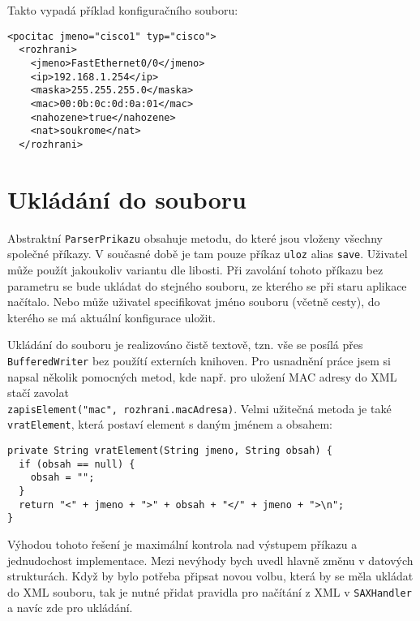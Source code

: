 Takto vypadá příklad konfiguračního souboru:
\begin{verbatim}
<pocitac jmeno="cisco1" typ="cisco">
  <rozhrani>
    <jmeno>FastEthernet0/0</jmeno>
    <ip>192.168.1.254</ip>
    <maska>255.255.255.0</maska>
    <mac>00:0b:0c:0d:0a:01</mac>
    <nahozene>true</nahozene>
    <nat>soukrome</nat>
  </rozhrani>
\end{verbatim} 


\section{Ukládání do souboru}
Abstraktní \verb|ParserPrikazu| obsahuje metodu, do které jsou vloženy všechny společné příkazy. V současné době je tam pouze příkaz \verb|uloz| alias \verb|save|. Uživatel může použít jakoukoliv variantu dle libosti. Při zavolání tohoto příkazu bez parametru se bude ukládat do stejného souboru, ze kterého se při staru aplikace načítalo. Nebo může uživatel specifikovat jméno souboru (včetně cesty), do kterého se má aktuální konfigurace uložit. 

Ukládání do souboru je realizováno čistě textově, tzn. vše se posílá přes \verb|BufferedWriter| bez použítí externích knihoven. Pro usnadnění práce jsem si napsal několik pomocných metod, kde např. pro uložení MAC adresy do XML stačí zavolat \\\verb|zapisElement("mac", rozhrani.macAdresa)|. Velmi užitečná metoda je také \verb|vratElement|, která postaví element s daným jménem a obsahem:
\begin{verbatim}
private String vratElement(String jmeno, String obsah) {
  if (obsah == null) {
    obsah = "";
  }
  return "<" + jmeno + ">" + obsah + "</" + jmeno + ">\n";
}
\end{verbatim} 


Výhodou tohoto řešení je maximální kontrola nad výstupem příkazu a jednudochost implementace. Mezi nevýhody bych uvedl hlavně změnu v datových strukturách. Když by bylo potřeba připsat novou volbu, která by se měla ukládat do XML souboru, tak je nutné přidat pravidla pro načítání z XML v \verb|SAXHandler| a navíc zde pro ukládání.





